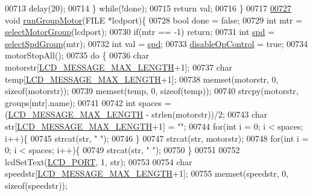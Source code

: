 \begin{DoxyCode}
{{{{{{{{{{{00713         delay(20);
00714     \} \textcolor{keywordflow}{while}(!done);
00715     \textcolor{keywordflow}{return} val;
00716 \}
00717 
\hypertarget{lcddiag_8c_source.tex_l00727}{}\hyperlink{lcddiag_8c_a61bf99fda231c065d2113f0c67b8d72a}{00727} \textcolor{keywordtype}{void} \hyperlink{lcddiag_8c_a61bf99fda231c065d2113f0c67b8d72a}{runGroupMotor}(FILE *lcdport)\{
00728     \textcolor{keywordtype}{bool} done = \textcolor{keyword}{false};
00729     \textcolor{keywordtype}{int} mtr = \hyperlink{lcddiag_8c_a45205137e2aea6d387568cabe3072002}{selectMotorGroup}(lcdport);
00730     \textcolor{keywordflow}{if}(mtr == -1) \textcolor{keywordflow}{return};
00731     \textcolor{keywordtype}{int} \hyperlink{opcontrol_8c_a642ce334330c8b0f6e33dd0a3fa65111}{spd} = \hyperlink{lcddiag_8c_a7a421f9cf3e21c806080bee51c68a5c9}{selectSpdGroup}(mtr);
00732     \textcolor{keywordtype}{int} val = \hyperlink{opcontrol_8c_a642ce334330c8b0f6e33dd0a3fa65111}{spd};
00733     \hyperlink{lcddiag_8c_a0f0b335cd078d025d6fb720eb3bf6437}{disableOpControl} = \textcolor{keyword}{true};
00734     motorStopAll();
00735     \textcolor{keywordflow}{do} \{
00736         \textcolor{keywordtype}{char} motorstr[\hyperlink{lcdmsg_8h_abe4c4b70fc6f44ae3680e5b2c68cdd00}{LCD\_MESSAGE\_MAX\_LENGTH}+1];
00737         \textcolor{keywordtype}{char} temp[\hyperlink{lcdmsg_8h_abe4c4b70fc6f44ae3680e5b2c68cdd00}{LCD\_MESSAGE\_MAX\_LENGTH}+1];
00738         memset(motorstr, 0, \textcolor{keyword}{sizeof}(motorstr));
00739         memset(temp, 0, \textcolor{keyword}{sizeof}(temp));
00740         strcpy(motorstr, groups[mtr].name);
00741 
00742         \textcolor{keywordtype}{int} spaces = (\hyperlink{lcdmsg_8h_abe4c4b70fc6f44ae3680e5b2c68cdd00}{LCD\_MESSAGE\_MAX\_LENGTH} - strlen(motorstr))/2;
00743         \textcolor{keywordtype}{char} str[\hyperlink{lcdmsg_8h_abe4c4b70fc6f44ae3680e5b2c68cdd00}{LCD\_MESSAGE\_MAX\_LENGTH}+1] = \textcolor{stringliteral}{""};
00744         \textcolor{keywordflow}{for}(\textcolor{keywordtype}{int} i = 0; i < spaces; i++)\{
00745             strcat(str, \textcolor{stringliteral}{" "});
00746         \}
00747         strcat(str, motorstr);
00748         \textcolor{keywordflow}{for}(\textcolor{keywordtype}{int} i = 0; i < spaces; i++)\{
00749             strcat(str, \textcolor{stringliteral}{" "});
00750         \}
00751 
00752         lcdSetText(\hyperlink{lcdmsg_8h_abcf42bd88b3c36193f301ca25b033875}{LCD\_PORT}, 1, str);
00753 
00754         \textcolor{keywordtype}{char} speedstr[\hyperlink{lcdmsg_8h_abe4c4b70fc6f44ae3680e5b2c68cdd00}{LCD\_MESSAGE\_MAX\_LENGTH}+1];
00755         memset(speedstr, 0, \textcolor{keyword}{sizeof}(speedstr));
}}}}}}}}}}}
\end{DoxyCode}

